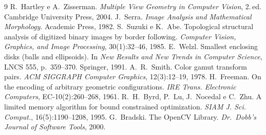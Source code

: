 \documentclass[11pt,a4paper]{article}
\theoremstyle{definition}
\theoremstyle{remark}
\begin{document}
\begin{thebibliography}{9}
 R.~Hartley e A.~Zisserman. \emph{Multiple View Geometry in
Computer Vision}, 2.\,ed. Cambridge University Press, 2004.
 J.~Serra. \emph{Image Analysis and Mathematical Morphology}.
Academic Press, 1982.
 S.~Suzuki e K.~Abe. Topological structural analysis of
digitized binary images by border following. \emph{Computer Vision, Graphics,
and Image Processing}, 30(1):32--46, 1985.
 E.~Welzl. Smallest enclosing disks (balls and ellipsoids).
In \emph{New Results and New Trends in Computer Science}, LNCS 555, p.~359--370.
Springer, 1991.
 A.~R.~Smith. Color gamut transform pairs. \emph{ACM SIGGRAPH
Computer Graphics}, 12(3):12--19, 1978.
 H.~Freeman. On the encoding of arbitrary geometric
configurations. \emph{IRE Trans. Electronic Computers}, EC-10(2):260--268, 1961.
 R.~H.~Byrd, P.~Lu, J.~Nocedal e C.~Zhu. A limited memory
algorithm for bound constrained optimization. \emph{SIAM J. Sci. Comput.},
16(5):1190--1208, 1995.
 G.~Bradski. The OpenCV Library. \emph{Dr.\ Dobb's Journal of
Software Tools}, 2000.
\end{thebibliography}
\end{document}
